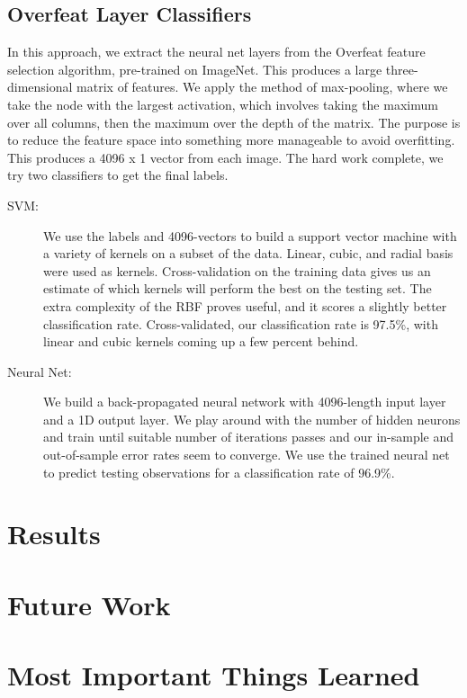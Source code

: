 \documentclass[12pt]{article}
\begin{document}
\subsection{Overfeat Layer Classifiers}
In this approach, we extract the neural net layers from the Overfeat feature selection algorithm, pre-trained on ImageNet. This produces a large three-dimensional matrix of features. We apply the method of max-pooling, where we take the node with the largest activation, which involves taking the maximum over all columns, then the maximum over the depth of the matrix. The purpose is to reduce the feature space into something more manageable to avoid overfitting. This produces a 4096 x 1 vector from each image. The hard work complete, we try two classifiers to get the final labels.
\begin{description}
\item[SVM:] We use the labels and 4096-vectors to build a support vector machine with a variety of kernels on a subset of the data. Linear, cubic, and radial basis were used as kernels. Cross-validation on the training data gives us an estimate of which kernels will perform the best on the testing set. The extra complexity of the RBF proves useful, and it scores a slightly better classification rate. Cross-validated, our classification rate is 97.5\%, with linear and cubic kernels coming up a few percent behind.

\item[Neural Net:] We build a back-propagated neural network with 4096-length input layer and a 1D output layer. We play around with the number of hidden neurons and train until suitable number of iterations passes and our in-sample and out-of-sample error rates seem to converge. We use the trained neural net to predict testing observations for a classification rate of 96.9\%.
\end{description}

\section{Results}

\section{Future Work}

\section{Most Important Things Learned}
\end{document}
